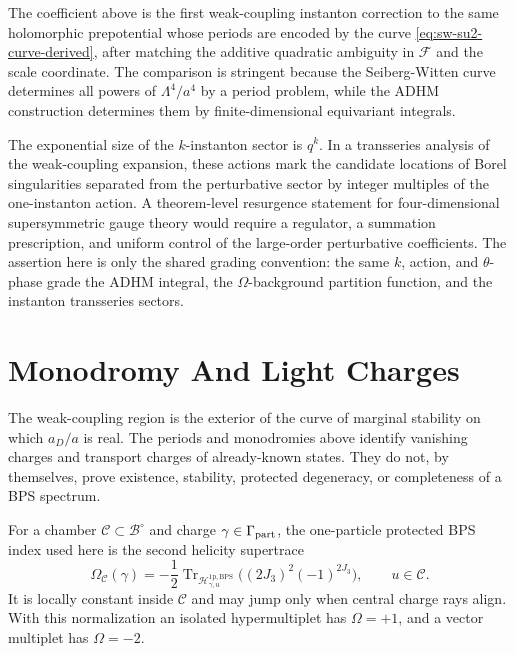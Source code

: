 The coefficient above is the
first weak-coupling instanton correction to the same holomorphic prepotential
whose periods are encoded by the curve \eqref{eq:sw-su2-curve-derived},
after matching the additive quadratic ambiguity in \(\mathcal F\) and the
scale coordinate.  The comparison is stringent because the Seiberg-Witten
curve determines all powers of \(\Lambda^4/a^4\) by a period problem, while
the ADHM construction determines them by finite-dimensional equivariant
integrals.

The exponential size of the \(k\)-instanton sector is \(q^k\).  In a
transseries analysis of the weak-coupling expansion, these actions mark the
candidate locations of Borel singularities separated from the perturbative
sector by integer multiples of the one-instanton action.  A theorem-level
resurgence statement for four-dimensional supersymmetric gauge theory would
require a regulator, a summation prescription, and uniform control of the
large-order perturbative coefficients.  The assertion here is only the shared
grading convention: the same \(k\), action, and \(\theta\)-phase grade the ADHM integral,
the \(\Omega\)-background partition function, and the instanton transseries
sectors.

\section{Monodromy And Light Charges}

The weak-coupling region is the exterior of the curve of marginal stability
on which \(a_D/a\) is real.  The periods and monodromies above identify
vanishing charges and transport charges of already-known states.  They do not,
by themselves, prove existence, stability, protected degeneracy, or
completeness of a BPS spectrum.

\begin{definition}
\label{def:rank-one-sw-bps-index}
For a chamber \(\mathcal C\subset\mathcal B^\circ\) and charge
\(\gamma\in\Gamma_{\rm part}\), the one-particle protected BPS index used here
is the second helicity supertrace
\[
  \Omega_{\mathcal C}(\gamma)
  =
  -\frac12
  \operatorname{Tr}_{\mathcal H^{\mathrm{1p,BPS}}_{\gamma,u}}
  \bigl((2J_3)^2(-1)^{2J_3}\bigr),
  \qquad u\in\mathcal C .
\]
It is locally constant inside \(\mathcal C\) and may jump only when central
charge rays align.  With this normalization an isolated hypermultiplet has
\(\Omega=+1\), and a vector multiplet has \(\Omega=-2\).
\end{definition}

